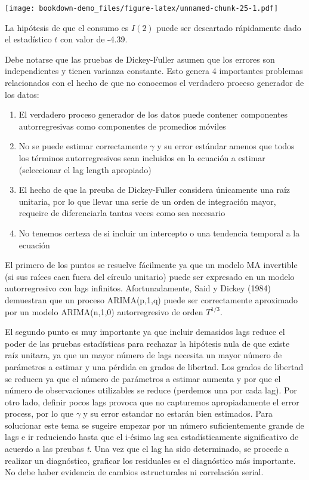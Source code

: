 \documentclass[]{book}
\providecommand{\tightlist}{%
  \setlength{\itemsep}{0pt}\setlength{\parskip}{0pt}}
\theoremstyle{definition}
\theoremstyle{definition}
\theoremstyle{definition}
\theoremstyle{remark}
\begin{document}
\texttt{[image: bookdown-demo\_files/figure-latex/unnamed-chunk-25-1.pdf]}

La hipótesis de que el consumo es \(I(2)\) puede ser descartado
rápidamente dado el estadístico \(t\) con valor de -4.39.

Debe notarse que las pruebas de Dickey-Fuller asumen que los errores son
independientes y tienen varianza constante. Esto genera 4 importantes
problemas relacionados con el hecho de que no conocemos el verdadero
proceso generador de los datos:

\begin{enumerate}
\def\labelenumi{\arabic{enumi})}
\tightlist
\item
  El verdadero proceso generador de los datos puede contener componentes
  autorregresivas como componentes de promedios móviles
\item
  No se puede estimar correctamente \(\gamma\) y su error estándar
  amenos que todos los términos autorregresivos sean incluidos en la
  ecuación a estimar (seleccionar el lag length apropiado)
\item
  El hecho de que la preuba de Dickey-Fuller considera únicamente una
  raíz unitaria, por lo que llevar una serie de un orden de integración
  mayor, requeire de diferenciarla tantas veces como sea necesario
\item
  No tenemos certeza de si incluir un intercepto o una tendencia
  temporal a la ecuación
\end{enumerate}

El primero de los puntos se resuelve fácilmente ya que un modelo MA
invertible (si sus raíces caen fuera del círculo unitario) puede ser
expresado en un modelo autorregresivo con lags infinitos.
Afortunadamente, Said y Dickey (1984) demuestran que un proceso
ARIMA(p,1,q) puede ser correctamente aproximado por un modelo
ARIMA(n,1,0) autorregresivo de orden \(T^{1/3}\).

El segundo punto es muy importante ya que incluir demasidos lags reduce
el poder de las pruebas estadísticas para rechazar la hipótesis nula de
que existe raíz unitara, ya que un mayor número de lags necesita un
mayor número de parámetros a estimar y una pérdida en grados de
libertad. Los grados de libertad se reducen ya que el número de
parámetros a estimar aumenta y por que el número de observaciones
utilizables se reduce (perdemos una por cada lag). Por otro lado,
definir pocos lags provoca que no capturemos apropiadamente el error
process, por lo que \(\gamma\) y su error estandar no estarán bien
estimados. Para solucionar este tema se sugeire empezar por un número
suficientemente grande de lags e ir reduciendo hasta que el i-ésimo lag
sea estadísticamente significativo de acuerdo a las preubas \emph{t}.
Una vez que el lag ha sido determinado, se procede a realizar un
diagnóstico, graficar los residuales es el diagnóstico más importante.
No debe haber evidencia de cambios estructurales ni correlación serial.
\end{document}
